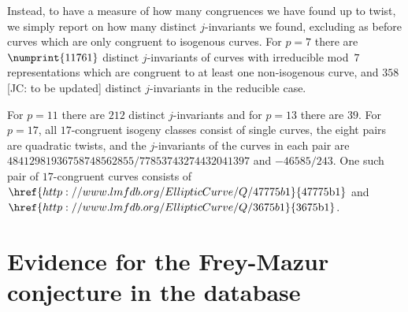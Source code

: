 \documentclass[12pt, reqno]{amsart}
\newcommand{\lmfdbec}[3]{\href{http://www.lmfdb.org/EllipticCurve/Q/#1#2#3}{{\text{\rm#1#2#3}}}}
\numberwithin{equation}{section}
\theoremstyle{definition}
\theoremstyle{remark}
\newcommand{\jc}[1]{{\color{darkgreen} \textsf{[JC: #1]}}}
\begin{document}
Instead, to have a measure of how many congruences we have found up to twist, we
simply report on how many distinct $j$-invariants we found, excluding as before
curves which are only congruent to isogenous curves.  For $p=7$ there are
$\numprint{11761}$ distinct $j$-invariants of curves with irreducible mod~$7$
representations which are congruent to at least one non-isogenous curve, and
$358$ \jc{to be updated} distinct $j$-invariants in the reducible case.

For $p=11$ there are $212$ distinct $j$-invariants and for $p=13$
there are $39$.  For $p=17$, all $17$-congruent isogeny classes
consist of single curves, the eight pairs are quadratic twists, and
the $j$-invariants of the curves in each pair are
$48412981936758748562855/77853743274432041397$ and $-46585/243$.  One
such pair of $17$-congruent curves consists of $\lmfdbec{47775}{b}{1}$
and~$\lmfdbec{3675}{b}{1}$.

\section{Evidence for the Frey-Mazur conjecture in the database}
\label{S:Frey-Mazur}
\end{document}

